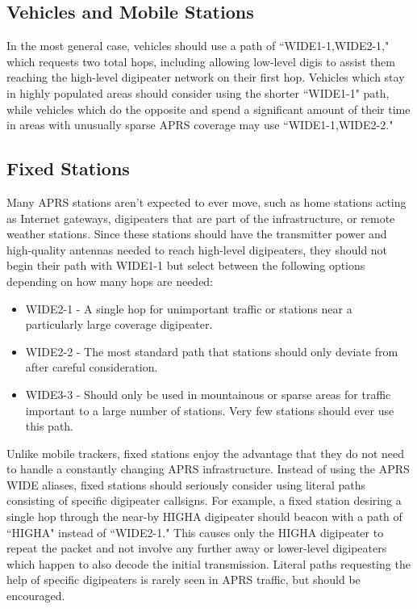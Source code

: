 \subsection{Vehicles and Mobile Stations}

In the most general case, vehicles should use a path of ``WIDE1-1,WIDE2-1,"
which requests two total hops, including allowing low-level digis to assist
them reaching the high-level digipeater network on their first hop.
Vehicles which stay in highly populated areas should consider using the
shorter ``WIDE1-1" path, while vehicles which do the opposite and spend
a significant amount
of their time in areas with unusually sparse APRS coverage 
may use ``WIDE1-1,WIDE2-2." \cite{infoaprspath}

\subsection{Fixed Stations}

Many APRS stations aren't expected to ever move, such as home stations acting
as Internet gateways, digipeaters that are part of the infrastructure, or
remote weather stations.
Since these stations should have the transmitter power and high-quality antennas
needed to reach high-level digipeaters,
they should not begin their path with WIDE1-1 but select between the following
options depending on how many hops are needed:
\begin{itemize}
	\item WIDE2-1 - A single hop for unimportant traffic or stations near a
		particularly large coverage digipeater.
	\item WIDE2-2 - The most standard path that stations should only
		deviate from after careful consideration.
	\item WIDE3-3 - Should only be used in mountainous or sparse areas for
		traffic important to a large number of stations. Very few
		stations should ever use this path.
\end{itemize}

Unlike mobile trackers,
fixed stations enjoy the advantage that they do not need to handle a
constantly changing APRS infrastructure.
Instead of using the APRS WIDE aliases, fixed stations should seriously
consider using literal paths consisting of specific digipeater callsigns.
For example, a fixed station desiring a single hop through the near-by
HIGHA digipeater should beacon with a path of ``HIGHA" instead of ``WIDE2-1."
This causes only the HIGHA digipeater to repeat the packet and not involve
any further away or lower-level digipeaters which happen to also decode the
initial transmission. 
Literal paths requesting the help of specific digipeaters is rarely
seen in APRS traffic, but should be encouraged.

